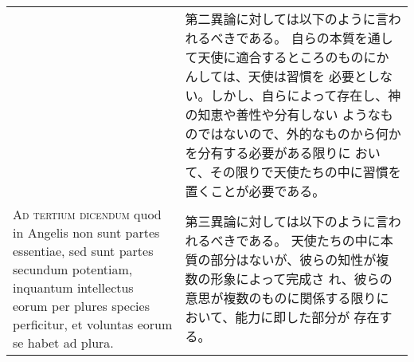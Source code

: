 \documentclass[10pt]{jsarticle} %
\begin{document}
\begin{longtable}{p{21em}p{21em}}
&

第二異論に対しては以下のように言われるべきである。
自らの本質を通して天使に適合するところのものにかんしては、天使は習慣を
 必要としない。しかし、自らによって存在し、神の知恵や善性や分有しない
 ようなものではないので、外的なものから何かを分有する必要がある限りに
 おいて、その限りで天使たちの中に習慣を置くことが必要である。

\\



{\scshape Ad tertium dicendum} quod in Angelis non sunt partes essentiae, sed
 sunt partes secundum potentiam, inquantum intellectus eorum per
 plures species perficitur, et voluntas eorum se habet ad plura.

&

第三異論に対しては以下のように言われるべきである。
天使たちの中に本質の部分はないが、彼らの知性が複数の形象によって完成さ
 れ、彼らの意思が複数のものに関係する限りにおいて、能力に即した部分が
 存在する。


\end{longtable}
\end{document}
